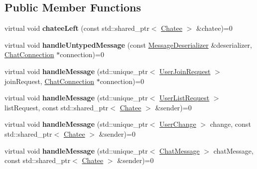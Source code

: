 \subsection*{Public Member Functions}
\begin{DoxyCompactItemize}
\item 
\hypertarget{classSimpleChat_1_1Server_a9e23c964082532000991ee2a2f699045}{virtual void {\bfseries chatee\-Left} (const std\-::shared\-\_\-ptr$<$ \hyperlink{classSimpleChat_1_1Chatee}{Chatee} $>$ \&chatee)=0}\label{classSimpleChat_1_1Server_a9e23c964082532000991ee2a2f699045}

\item 
\hypertarget{classSimpleChat_1_1Server_ad4b5157889b3d262efd3f86840aad333}{virtual void {\bfseries handle\-Untyped\-Message} (const \hyperlink{classSimpleChat_1_1MessageDeserializer}{Message\-Deserializer} \&deserializer, \hyperlink{classSimpleChat_1_1ChatConnection}{Chat\-Connection} $\ast$connection)=0}\label{classSimpleChat_1_1Server_ad4b5157889b3d262efd3f86840aad333}

\item 
\hypertarget{classSimpleChat_1_1Server_a73a8a4b05d7168c2b3b6213ccfc07c5e}{virtual void {\bfseries handle\-Message} (std\-::unique\-\_\-ptr$<$ \hyperlink{classSimpleChat_1_1UserJoinRequest}{User\-Join\-Request} $>$ join\-Request, \hyperlink{classSimpleChat_1_1ChatConnection}{Chat\-Connection} $\ast$connection)=0}\label{classSimpleChat_1_1Server_a73a8a4b05d7168c2b3b6213ccfc07c5e}

\item 
\hypertarget{classSimpleChat_1_1Server_a0826dd0d3d4f3f4c9cef8db37b3de0da}{virtual void {\bfseries handle\-Message} (std\-::unique\-\_\-ptr$<$ \hyperlink{classSimpleChat_1_1UserListRequest}{User\-List\-Request} $>$ list\-Request, const std\-::shared\-\_\-ptr$<$ \hyperlink{classSimpleChat_1_1Chatee}{Chatee} $>$ \&sender)=0}\label{classSimpleChat_1_1Server_a0826dd0d3d4f3f4c9cef8db37b3de0da}

\item 
\hypertarget{classSimpleChat_1_1Server_a41ee4829f9ec2726534ccdf47334b6d5}{virtual void {\bfseries handle\-Message} (std\-::unique\-\_\-ptr$<$ \hyperlink{classSimpleChat_1_1UserChange}{User\-Change} $>$ change, const std\-::shared\-\_\-ptr$<$ \hyperlink{classSimpleChat_1_1Chatee}{Chatee} $>$ \&sender)=0}\label{classSimpleChat_1_1Server_a41ee4829f9ec2726534ccdf47334b6d5}

\item 
\hypertarget{classSimpleChat_1_1Server_adbb31e147762d38576f1a959c65deff8}{virtual void {\bfseries handle\-Message} (std\-::unique\-\_\-ptr$<$ \hyperlink{classSimpleChat_1_1ChatMessage}{Chat\-Message} $>$ chat\-Message, const std\-::shared\-\_\-ptr$<$ \hyperlink{classSimpleChat_1_1Chatee}{Chatee} $>$ \&sender)=0}\label{classSimpleChat_1_1Server_adbb31e147762d38576f1a959c65deff8}


\end{DoxyCompactItemize}
